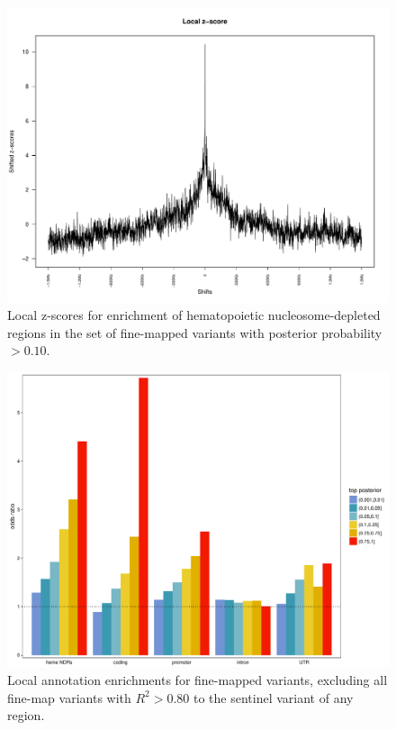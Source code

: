 \documentclass{article}\usepackage[]{graphicx}\usepackage[]{color}
\begin{document}
\begin{figure}
\centering
\includegraphics[width=\linewidth]{staticFigures/FINEMAP_PP10_localzscore_10000.pdf}
\caption{Local z-scores for enrichment of hematopoietic nucleosome-depleted regions in the set of fine-mapped variants with posterior probability $> 0.10$.}
\end{figure} 

\begin{figure}
\centering
\includegraphics[width=\linewidth]{staticFigures/FINEMAP_enrichments_ExcludingSentinels.pdf}
\caption{Local annotation enrichments for fine-mapped variants, excluding all fine-map variants with $R^2>0.80$ to the sentinel variant of any region.}
\end{figure} 
\end{document}
